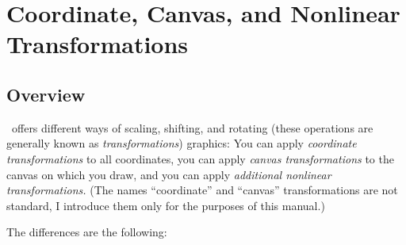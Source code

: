 %
%
%

\section{Coordinate, Canvas, and Nonlinear Transformations}

\subsection{Overview}

\pgfname\ offers different ways of scaling, shifting, and rotating
(these operations are generally known as \emph{transformations})
graphics: You can apply \emph{coordinate transformations} to all
coordinates, you can apply \emph{canvas transformations} to the
canvas on which you draw, and you can apply \emph{additional nonlinear
  transformations.} (The names ``coordinate'' and ``canvas''
transformations are not standard, I introduce them only for the
purposes of this manual.)

The differences are the following:

